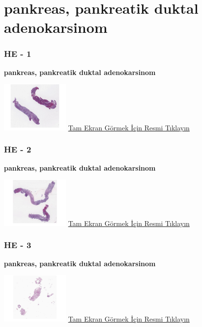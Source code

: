 \documentclass[
  letterpaper,
  DIV=11,
  numbers=noendperiod]{scrreprt}
\begin{document}
\hypertarget{sec-PDAC-tru-cut}{%
\chapter{pankreas, pankreatik duktal
adenokarsinom}\label{sec-PDAC-tru-cut}}

\hypertarget{he---1-2}{%
\subsection{HE - 1}\label{he---1-2}}

\textbf{pankreas, pankreatik duktal adenokarsinom}

\href{https://images.patolojiatlasi.com/PDAC-tru-cut/HE1.html}{\includegraphics[width=0.25\textwidth,height=\textheight]{./screenshots/thumbnail_PDAC-tru-cut-1.png}}
\href{https://images.patolojiatlasi.com/PDAC-tru-cut/HE1.html}{Tam Ekran
Görmek İçin Resmi Tıklayın}

\hypertarget{he---2-2}{%
\subsection{HE - 2}\label{he---2-2}}

\textbf{pankreas, pankreatik duktal adenokarsinom}

\href{https://images.patolojiatlasi.com/PDAC-tru-cut/HE2.html}{\includegraphics[width=0.25\textwidth,height=\textheight]{./screenshots/thumbnail_PDAC-tru-cut-2.png}}
\href{https://images.patolojiatlasi.com/PDAC-tru-cut/HE2.html}{Tam Ekran
Görmek İçin Resmi Tıklayın}

\hypertarget{he---3-2}{%
\subsection{HE - 3}\label{he---3-2}}

\textbf{pankreas, pankreatik duktal adenokarsinom}

\href{https://images.patolojiatlasi.com/PDAC-tru-cut/HE3.html}{\includegraphics[width=0.25\textwidth,height=\textheight]{./screenshots/thumbnail_PDAC-tru-cut-3.png}}
\href{https://images.patolojiatlasi.com/PDAC-tru-cut/HE3.html}{Tam Ekran
Görmek İçin Resmi Tıklayın}
\end{document}

